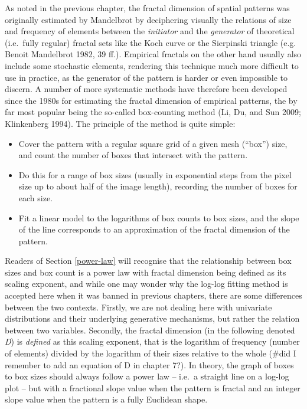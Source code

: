 \documentclass[
  12pt,
  a4paper, twoside]{book}
\begin{document}
As noted in the previous chapter, the fractal dimension of spatial patterns was originally estimated by Mandelbrot by deciphering visually the relations of size and frequency of elements between the \emph{initiator} and the \emph{generator} of theoretical (i.e.~fully regular) fractal sets like the Koch curve or the Sierpinski triangle (e.g. Benoit Mandelbrot 1982, 39 ff.). Empirical fractals on the other hand usually also include some stochastic elements, rendering this technique much more difficult to use in practice, as the generator of the pattern is harder or even impossible to discern. A number of more systematic methods have therefore been developed since the 1980s for estimating the fractal dimension of empirical patterns, the by far most popular being the so-called box-counting method (Li, Du, and Sun 2009; Klinkenberg 1994). The principle of the method is quite simple:

\begin{itemize}
\item
  Cover the pattern with a regular square grid of a given mesh (``box'') size, and count the number of boxes that intersect with the pattern.
\item
  Do this for a range of box sizes (usually in exponential steps from the pixel size up to about half of the image length), recording the number of boxes for each size.
\item
  Fit a linear model to the logarithms of box counts to box sizes, and the slope of the line corresponds to an approximation of the fractal dimension of the pattern.
\end{itemize}

Readers of Section \ref{power-law} will recognise that the relationship between box sizes and box count is a power law with fractal dimension being defined as its scaling exponent, and while one may wonder why the log-log fitting method is accepted here when it was banned in previous chapters, there are some differences between the two contexts. Firstly, we are not dealing here with univariate distributions and their underlying generative mechanisms, but rather the relation between two variables. Secondly, the fractal dimension (in the following denoted \emph{D}) is \emph{defined} as this scaling exponent, that is the logarithm of frequency (number of elements) divided by the logarithm of their sizes relative to the whole (\#did I remember to add an equation of D in chapter 7?). In theory, the graph of boxes to box sizes should always follow a power law -- i.e.~a straight line on a log-log plot -- but with a fractional slope value when the pattern is fractal and an integer slope value when the pattern is a fully Euclidean shape.
\end{document}
